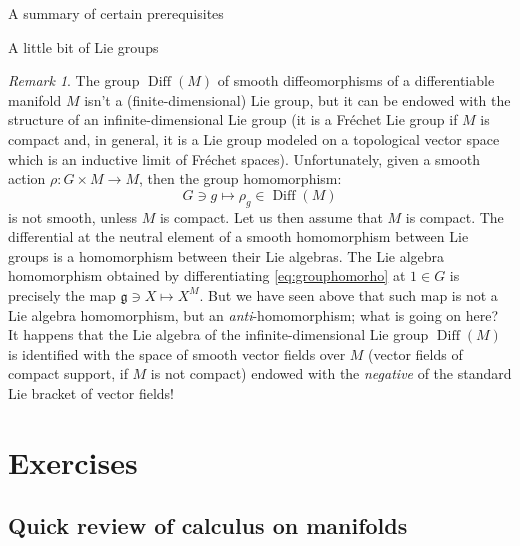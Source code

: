 \documentclass[oneside,a4paper,11pt]{amsbook}
\DeclareMathOperator{\Diff}{Diff}
\theoremstyle{remark}\newtheorem{exercise}{Exercise}[chapter]
\theoremstyle{plain}\newtheorem{teo}{Theorem}[section]
\theoremstyle{plain}\newtheorem{lem}[teo]{Lemma}
\theoremstyle{plain}\newtheorem{prop}[teo]{Proposition}
\theoremstyle{plain}\newtheorem{cor}[teo]{Corollary}
\theoremstyle{definition}\newtheorem{defin}[teo]{Definition}
\theoremstyle{remark}\newtheorem{rem}[teo]{Remark}
\theoremstyle{definition}\newtheorem{notation}[teo]{Notation}
\theoremstyle{definition}\newtheorem{convention}[teo]{Convention}
\theoremstyle{definition}\newtheorem{example}[teo]{Example}
\numberwithin{section}{chapter}
\numberwithin{equation}{section}
\begin{document}
\begin{chapter}{A summary of certain prerequisites}
\begin{section}{A little bit of Lie groups}
\begin{rem}
The group $\Diff(M)$ of smooth diffeomorphisms of a differentiable manifold $M$
isn't a (finite-dimensional) Lie group, but it can be endowed with the structure of
an infinite-dimensional Lie group (it is a Fr\'echet Lie group if $M$ is compact and, in general, it is a Lie group
modeled on a topological vector space which is an inductive limit of Fr\'echet spaces). Unfortunately,
given a smooth action $\rho:G\times M\to M$, then the group homomorphism:
\begin{equation}\label{eq:grouphomorho}
G\ni g\longmapsto\rho_g\in\Diff(M)
\end{equation}
is not smooth, unless $M$ is compact. Let us then assume that $M$ is compact. The differential at the neutral
element of a smooth homomorphism between Lie groups is a homomorphism between their Lie algebras.
The Lie algebra homomorphism obtained by differentiating \eqref{eq:grouphomorho} at $1\in G$ is precisely the map
$\mathfrak g\ni X\mapsto X^{\!M}$. But we have seen above that such map is not a Lie algebra homomorphism, but
an {\em anti}-homomorphism; what is going on here? It happens that the Lie algebra of the infinite-dimensional
Lie group $\Diff(M)$ is identified with the space of smooth vector fields over $M$ (vector fields of compact support,
if $M$ is not compact) endowed with the {\em negative\/} of the standard Lie bracket of vector fields!
\end{rem}

\end{section}

\goodbreak

\section*{Exercises}

\subsection*{Quick review of calculus on manifolds}


\end{chapter}
\end{document}
